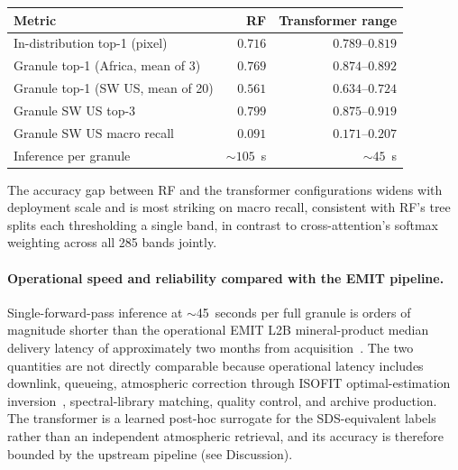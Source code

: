 \documentclass[11pt]{article}
\begin{document}
\begin{center}
\small
\begin{tabular}{lrr}
\hline
\rowcolor[gray]{0.85}
\textbf{Metric} & \textbf{RF} & \textbf{Transformer range} \\
\hline
In-distribution top-1 (pixel)              & $0.716$        & $0.789$--$0.819$ \\
Granule top-1 (Africa, mean of 3)          & $0.769$        & $0.874$--$0.892$ \\
Granule top-1 (SW US, mean of 20)          & $0.561$        & $0.634$--$0.724$ \\
Granule SW US top-3                        & $0.799$        & $0.875$--$0.919$ \\
Granule SW US macro recall                 & $0.091$        & $0.171$--$0.207$ \\
Inference per granule                      & $\sim$$105$~s  & $\sim$$45$~s     \\
\hline
\end{tabular}
\end{center}

The accuracy gap between RF and the transformer configurations widens with deployment scale and is most striking on macro recall, consistent with RF's tree splits each thresholding a single band, in contrast to cross-attention's softmax weighting across all 285 bands jointly.

\paragraph{Operational speed and reliability compared with the EMIT pipeline.}
Single-forward-pass inference at $\sim$45~seconds per full granule is orders of magnitude shorter than the operational EMIT L2B mineral-product median delivery latency of approximately two months from acquisition~\cite{emit_l2b_atbd}.
The two quantities are not directly comparable because operational latency includes downlink, queueing, atmospheric correction through ISOFIT optimal-estimation inversion~\cite{thompson2018,brodrick2021}, spectral-library matching, quality control, and archive production.
The transformer is a learned post-hoc surrogate for the SDS-equivalent labels rather than an independent atmospheric retrieval, and its accuracy is therefore bounded by the upstream pipeline (see Discussion).
\end{document}

